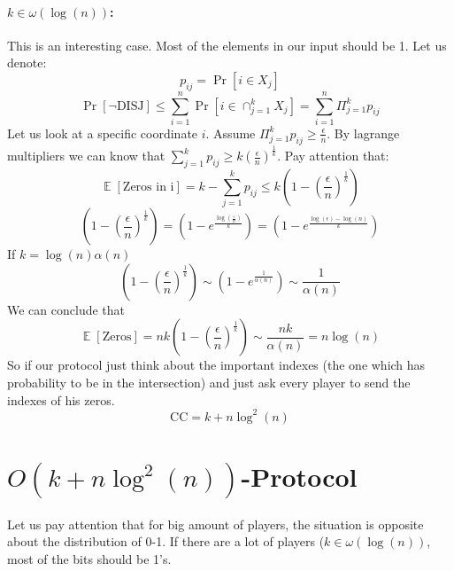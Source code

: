 \documentclass{article}
\theoremstyle{plain}
\begin{document}
\paragraph{$k \in \omega(\log(n))$:}
This is an interesting case. Most of the elements in our input should be 1. 
Let us denote:
\begin{equation*}
    p_{ij} = \Pr[i \in X_j]
\end{equation*}
\begin{equation*}
    \Pr[\neg \text{DISJ}] \leq \sum_{i=1}^{n}\Pr[i \in \cap_{j=1}^{k}X_j] = \sum_{i=1}^{n}\Pi_{j=1}^{k}p_{ij}
\end{equation*}
Let us look at a specific coordinate $i$. Assume $\Pi_{j=1}^{k}p_{ij} \geq \frac{\epsilon}{n}$.
By lagrange multipliers we can know that $\sum_{j=1}^{k}p_{ij} \geq k(\frac{\epsilon}{n})^{\frac{1}{k}}$.
Pay attention that:
\begin{equation*}
    \mathop{\mathbb{E}}[\text{Zeros in i}] = k - \sum_{j=1}^{k}p_{ij} \leq k \left(1 - \left(\frac{\epsilon}{n}\right)^{\frac{1}{k}}\right)
\end{equation*}
\begin{equation*}
    \left(1 - \left(\frac{\epsilon}{n}\right)^{\frac{1}{k}}\right) = \left(1 - e^{\frac{\log(\frac{\epsilon}{n})}{k}}\right) = \left(1 - e^{\frac{\log(\epsilon) -\log(n)}{k}}\right)
\end{equation*}
If $k = \log(n) \alpha(n)$
\begin{equation*}
    \left(1 - \left(\frac{\epsilon}{n}\right)^{\frac{1}{k}}\right) \sim \left(1 - e^{\frac{1}{\alpha(n)}}\right) \sim \frac{1}{\alpha(n)}
\end{equation*}
We can conclude that
\begin{equation*}
    \mathop{\mathbb{E}}[\text{Zeros}] = nk\left(1 - \left(\frac{\epsilon}{n}\right)^{\frac{1}{k}}\right) \sim \frac{nk}{\alpha(n)} = n\log(n)
\end{equation*}
So if our protocol just think about the important indexes (the one which has probability to be in the intersection) and just ask every player to send the indexes of his zeros.
\begin{equation*}
    \text{CC} = k + n\log^2(n)
\end{equation*}
\section{$O(k + n\log^2(n))$-Protocol}
Let us pay attention that for big amount of players, the situation is opposite about the distribution of 0-1. If there are a lot of players ($k \in \omega(\log(n))$, most of the bits should be 1's.
\end{document}

